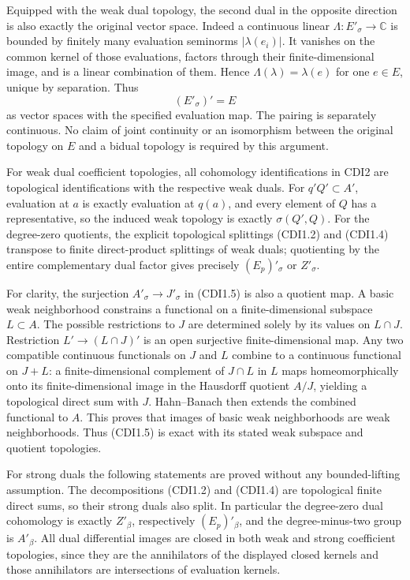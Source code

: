 Equipped with the weak dual topology, the second dual in the opposite
direction is also exactly the original vector space. Indeed a continuous
linear \(\Lambda:E'_\sigma\to\mathbb C\) is bounded by finitely many
evaluation seminorms \(|\lambda(e_i)|\). It vanishes on the common
kernel of those evaluations, factors through their finite-dimensional
image, and is a linear combination of them. Hence
\(\Lambda(\lambda)=\lambda(e)\) for one \(e\in E\), unique by
separation. Thus \[
(E'_\sigma)'=E
\tag{CDI3.1}
\] as vector spaces with the specified evaluation map. The pairing is
separately continuous. No claim of joint continuity or an isomorphism
between the original topology on \(E\) and a bidual topology is required
by this argument.

For weak dual coefficient topologies, all cohomology identifications in
CDI2 are topological identifications with the respective weak duals. For
\(q'Q'\subset A'\), evaluation at \(a\) is exactly evaluation at
\(q(a)\), and every element of \(Q\) has a representative, so the
induced weak topology is exactly \(\sigma(Q',Q)\). For the degree-zero
quotients, the explicit topological splittings (CDI1.2) and (CDI1.4)
transpose to finite direct-product splittings of weak duals; quotienting
by the entire complementary dual factor gives precisely
\((E_p)'_\sigma\) or \(Z'_\sigma\).

For clarity, the surjection \(A'_\sigma\to J'_\sigma\) in (CDI1.5) is
also a quotient map. A basic weak neighborhood constrains a functional
on a finite-dimensional subspace \(L\subset A\). The possible
restrictions to \(J\) are determined solely by its values on
\(L\cap J\). Restriction \(L'\to(L\cap J)'\) is an open surjective
finite-dimensional map. Any two compatible continuous functionals on
\(J\) and \(L\) combine to a continuous functional on \(J+L\): a
finite-dimensional complement of \(J\cap L\) in \(L\) maps
homeomorphically onto its finite-dimensional image in the Hausdorff
quotient \(A/J\), yielding a topological direct sum with \(J\).
Hahn--Banach then extends the combined functional to \(A\). This proves
that images of basic weak neighborhoods are weak neighborhoods. Thus
(CDI1.5) is exact with its stated weak subspace and quotient topologies.

For strong duals the following statements are proved without any
bounded-lifting assumption. The decompositions (CDI1.2) and (CDI1.4) are
topological finite direct sums, so their strong duals also split. In
particular the degree-zero dual cohomology is exactly \(Z'_\beta\),
respectively \((E_p)'_\beta\), and the degree-minus-two group is
\(A'_\beta\). All dual differential images are closed in both weak and
strong coefficient topologies, since they are the annihilators of the
displayed closed kernels and those annihilators are intersections of
evaluation kernels.

